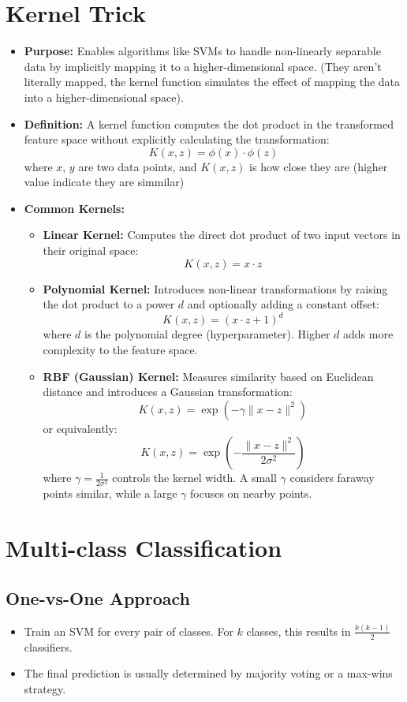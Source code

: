 \documentclass[10pt]{article}
\begin{document}
\section{Kernel Trick}
\begin{itemize}
    \item \textbf{Purpose:} Enables algorithms like SVMs to handle non-linearly separable data by implicitly mapping it to a higher-dimensional space. (They aren't literally mapped, the kernel function simulates the effect of mapping the data into a higher-dimensional space).
    \item \textbf{Definition:} A kernel function computes the dot product in the transformed feature space without explicitly calculating the transformation:
    \[
    K(x, z) = \phi(x) \cdot \phi(z)
    \]
    where $x$, $y$ are two data points, and $K(x, z)$ is how close they are (higher value indicate they are simmilar)
    \item \textbf{Common Kernels:}
    \begin{itemize}
        \item \textbf{Linear Kernel:} Computes the direct dot product of two input vectors in their original space:
        \[
        K(x, z) = x \cdot z
        \]
        \item \textbf{Polynomial Kernel:} Introduces non-linear transformations by raising the dot product to a power \(d\) and optionally adding a constant offset:
        \[
        K(x, z) = (x \cdot z + 1)^d
        \]
        where \(d\) is the polynomial degree (hyperparameter). Higher \(d\) adds more complexity to the feature space.
        \item \textbf{RBF (Gaussian) Kernel:} Measures similarity based on Euclidean distance and introduces a Gaussian transformation:
        \[
        K(x, z) = \exp\left(-\gamma \|x - z\|^2\right)
        \]
        or equivalently:
        \[
        K(x, z) = \exp\left(-\frac{\|x - z\|^2}{2\sigma^2}\right)
        \]
        where \(\gamma = \frac{1}{2\sigma^2}\) controls the kernel width. A small \(\gamma\) considers faraway points similar, while a large \(\gamma\) focuses on nearby points.
    \end{itemize}
\end{itemize}

\section{Multi-class Classification}

\subsection{One-vs-One Approach}
\begin{itemize}
    \item Train an SVM for every pair of classes. For \(k\) classes, this results in \(\frac{k(k-1)}{2}\) classifiers.
    \item The final prediction is usually determined by majority voting or a max-wins strategy.
\end{itemize}
\end{document}
